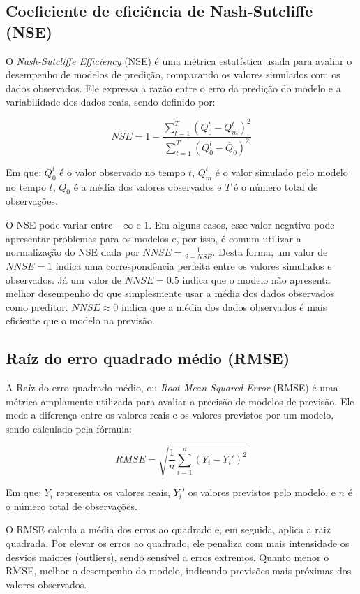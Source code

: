 \subsection{Coeficiente de eficiência de Nash-Sutcliffe (NSE)}
O \textit{Nash-Sutcliffe Efficiency} (NSE) é uma métrica estatística usada para avaliar o desempenho de modelos de
predição, comparando os valores simulados com os dados observados. Ele expressa a razão entre o erro da predição do
modelo e a variabilidade dos dados reais, sendo definido por:

\begin{equation}
NSE = 1 - \frac{\sum_{t=1}^{T} (Q^t_0 - Q^t_m)^2}{\sum_{t=1}^{T} (Q^t_0 - \overline{Q}_0)^2}
\end{equation}

Em que: $Q^t_0$ é o valor observado no tempo $t$, $Q^t_m$ é o valor simulado pelo modelo no tempo $t$, $\overline{Q}_0$
é a média dos valores observados e $T$ é o número total de observações.

O NSE pode variar entre $-\infty$ e $1$. Em alguns casos, esse valor negativo pode apresentar problemas para os modelos
e, por isso, é comum utilizar a normalização do NSE dada por $NNSE = \frac{1}{2-NSE}$. Desta forma, um valor de $NNSE =
1$ indica uma correspondência perfeita entre os valores simulados e observados. Já um valor de $NNSE = 0.5$ indica que o
modelo não apresenta melhor desempenho do que simplesmente usar a média dos dados observados como preditor. $NNSE
\approx 0$ indica que a média dos dados observados é mais eficiente que o modelo na previsão.

\subsection{Raíz do erro quadrado médio (RMSE)}
A Raíz do erro quadrado médio, ou \textit{Root Mean Squared Error} (RMSE) é uma métrica amplamente utilizada para
avaliar a precisão de modelos de previsão. Ele mede a diferença entre os valores reais e os valores previstos por um
modelo, sendo calculado pela fórmula:

\begin{equation}
RMSE = \sqrt{\frac{1}{n} \sum_{i=1}^{n} (Y_i - Y_i')^2}
\end{equation}

Em que: $Y_i$ representa os valores reais, $Y_i'$ os valores previstos pelo modelo, e $n$ é o número total de
observações.

O RMSE calcula a média dos erros ao quadrado e, em seguida, aplica a raiz quadrada. Por elevar os erros ao quadrado, ele
penaliza com mais intensidade os desvios maiores (outliers), sendo sensível a erros extremos. Quanto menor o RMSE,
melhor o desempenho do modelo, indicando previsões mais próximas dos valores observados.

